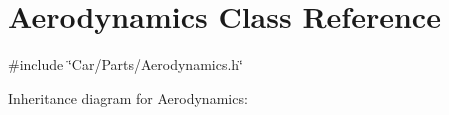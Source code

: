 \hypertarget{classAerodynamics}{}\section{Aerodynamics Class Reference}
\label{classAerodynamics}


{\ttfamily \#include \char`\"{}Car/\+Parts/\+Aerodynamics.\+h\char`\"{}}



Inheritance diagram for Aerodynamics\+:
